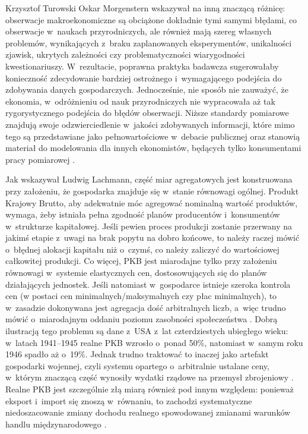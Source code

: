 \begin{artplenv}{Krzysztof Turowski}
Oskar Morgenstern wskazywał na inną znaczącą różnicę: obserwacje makroekonomiczne są obciążone dokładnie tymi samymi
błędami, co obserwacje w~naukach przyrodniczych, ale również mają szereg własnych problemów, wynikających z~braku
zaplanowanych eksperymentów, unikalności zjawisk, ukrytych zależności czy problematyczności wiarygodności
kwestionariuszy. W~rezultacie, poprawna praktyka badawcza sugerowałaby konieczność zdecydowanie bardziej
ostrożnego i~wymagającego podejścia do zdobywania danych gospodarczych. Jednocześnie, nie sposób nie zauważyć,
że ekonomia, w~odróżnieniu od nauk przyrodniczych nie wypracowała aż tak rygorystycznego podejścia do błędów obserwacji. Niższe
standardy pomiarowe znajdują swoje odzwierciedlenie w~jakości zdobywanych informacji, które mimo tego są przedstawiane
jako pełnowartościowe w~debacie publicznej oraz stanowią materiał do modelowania dla innych ekonomistów, będących tylko
konsumentami pracy pomiarowej
\parencite{morgenstern_accuracy_1963}.

Jak wskazywał Ludwig Lachmann, część miar agregatowych jest konstruowana przy założeniu, że gospodarka znajduje
się w~stanie równowagi ogólnej. Produkt Krajowy Brutto, aby adekwatnie móc agregować nominalną wartość produktów, wymaga,
żeby istniała pełna zgodność planów producentów i~konsumentów w~strukturze kapitałowej. Jeśli pewien proces produkcji
zostanie przerwany na jakimś etapie z~uwagi na brak popytu na dobro końcowe, to należy raczej mówić o~błędnej alokacji
kapitału niż o~czymś, co należy zaliczyć do wartościowej całkowitej produkcji. Co więcej, PKB jest miarodajne tylko
przy założeniu równowagi w~systemie elastycznych cen, dostosowujących się do planów działających jednostek. Jeśli
natomiast w~gospodarce istnieje szeroka kontrola cen (w postaci cen minimalnych/maksymalnych czy płac minimalnych), to
w~zasadzie dokonywana jest agregacja dość arbitralnych liczb, a~więc trudno mówić o~miarodajnym oddaniu poziomu
zasobności społeczeństwa
\parencite{lachmann_macro-economic_1973}.
Dobrą ilustracją tego problemu są dane z~USA z~lat
czterdziestych ubiegłego wieku: w~latach 1941--1945 realne PKB wzrosło o~ponad 50\%, natomiast w~samym roku 1946 spadło
aż o~19\%. Jednak trudno traktować to inaczej jako artefakt gospodarki wojennej, czyli systemu opartego o~arbitralnie
ustalane ceny, w~którym znaczącą część wynosiły wydatki rządowe na przemysł zbrojeniowy
\parencite{vedder_great_1991}.
Realne PKB jest szczególnie złą miarą również pod innym względem:
ponieważ eksport i~import się znoszą w~równaniu, to zachodzi systematyczne niedoszacowanie zmiany dochodu realnego
spowodowanej zmianami warunków handlu międzynarodowego
\parencite{kohli_real_2004}.


\end{artplenv}
